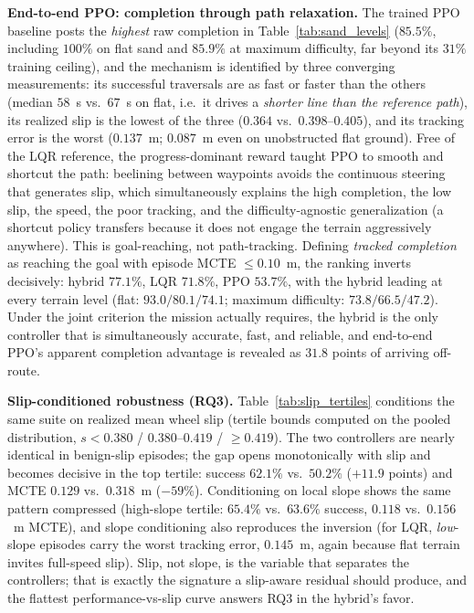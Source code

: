 \documentclass[conference]{IEEEtran}
\begin{document}
\vspace{1mm}
\noindent\textbf{End-to-end PPO: completion through path relaxation.} The trained PPO baseline posts the \emph{highest} raw completion in Table~\ref{tab:sand_levels} ($85.5\%$, including $100\%$ on flat sand and $85.9\%$ at maximum difficulty, far beyond its $31\%$ training ceiling), and the mechanism is identified by three converging measurements: its successful traversals are as fast or faster than the others (median $58$~s vs.\ $67$~s on flat, i.e.\ it drives a \emph{shorter line than the reference path}), its realized slip is the lowest of the three ($0.364$ vs.\ $0.398$--$0.405$), and its tracking error is the worst ($0.137$~m; $0.087$~m even on unobstructed flat ground). Free of the LQR reference, the progress-dominant reward taught PPO to smooth and shortcut the path: beelining between waypoints avoids the continuous steering that generates slip, which simultaneously explains the high completion, the low slip, the speed, the poor tracking, and the difficulty-agnostic generalization (a shortcut policy transfers because it does not engage the terrain aggressively anywhere). This is goal-reaching, not path-tracking. Defining \emph{tracked completion} as reaching the goal with episode MCTE $\le 0.10$~m, the ranking inverts decisively: hybrid $77.1\%$, LQR $71.8\%$, PPO $53.7\%$, with the hybrid leading at every terrain level (flat: $93.0 / 80.1 / 74.1$; maximum difficulty: $73.8 / 66.5 / 47.2$). Under the joint criterion the mission actually requires, the hybrid is the only controller that is simultaneously accurate, fast, and reliable, and end-to-end PPO's apparent completion advantage is revealed as $31.8$ points of arriving off-route.

\vspace{1mm}
\noindent\textbf{Slip-conditioned robustness (RQ3).} Table~\ref{tab:slip_tertiles} conditions the same suite on realized mean wheel slip (tertile bounds computed on the pooled distribution, $s < 0.380$ / $0.380$--$0.419$ / $\ge 0.419$). The two controllers are nearly identical in benign-slip episodes; the gap opens monotonically with slip and becomes decisive in the top tertile: success $62.1\%$ vs.\ $50.2\%$ ($+11.9$ points) and MCTE $0.129$ vs.\ $0.318$~m ($-59\%$). Conditioning on local slope shows the same pattern compressed (high-slope tertile: $65.4\%$ vs.\ $63.6\%$ success, $0.118$ vs.\ $0.156$~m MCTE), and slope conditioning also reproduces the inversion (for LQR, \emph{low}-slope episodes carry the worst tracking error, $0.145$~m, again because flat terrain invites full-speed slip). Slip, not slope, is the variable that separates the controllers; that is exactly the signature a slip-aware residual should produce, and the flattest performance-vs-slip curve answers RQ3 in the hybrid's favor.
\end{document}
